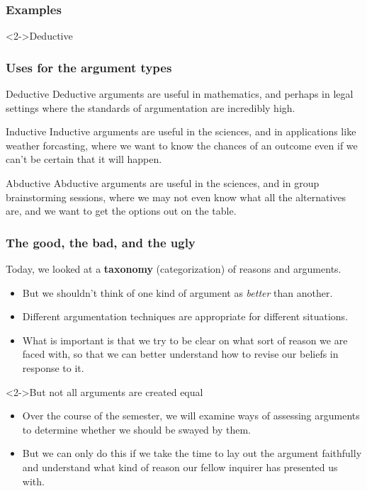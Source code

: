 \begin{frame}
\frametitle{Examples}
\small

\begin{block}<2->{Deductive}

\end{block}

\end{frame}

\begin{frame}
\frametitle{Uses for the argument types}

\begin{block}{Deductive}
Deductive arguments are useful in mathematics, and perhaps in legal settings where the standards of argumentation are incredibly high.
\end{block}

\begin{block}{Inductive}
Inductive arguments are useful in the sciences, and in applications like weather forcasting, where we want to know the chances of an outcome even if we can't be certain that it will happen.
\end{block}

\begin{block}{Abductive}
Abductive arguments are useful in the sciences, and in group brainstorming sessions, where we may not even know what all the alternatives are, and we want to get the options out on the table.
\end{block}

\end{frame}

\begin{frame}
\frametitle{The good, the bad, and the ugly}
\small

\begin{block}{Today, we looked at a \textbf{taxonomy} (categorization) of reasons and arguments.}
\begin{itemize} 
  \item But we shouldn't think of one kind of argument as \textit{better} than another.
  \item Different argumentation techniques are appropriate for different situations.
  \item What is important is that we try to be clear on what sort of reason we are faced with, so that we can better understand how to revise our beliefs in response to it.
\end{itemize}
\end{block}

\begin{block}<2->{But not all arguments are created equal}
\begin{itemize}
  \item Over the course of the semester, we will examine ways of assessing arguments to determine whether we should be swayed by them.
  \item But we can only do this if we take the time to lay out the argument faithfully and understand what kind of reason our fellow inquirer has presented us with.
\end{itemize}
\end{block}

\end{frame}

